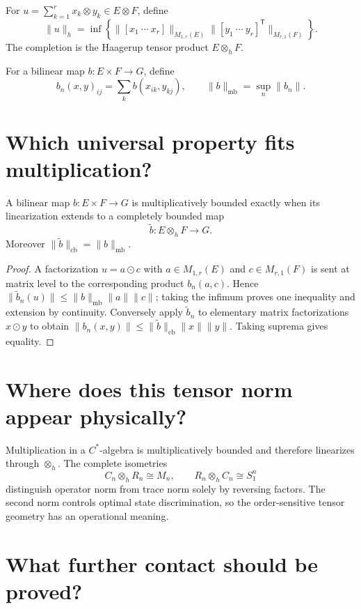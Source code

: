 For $u=\sum_{k=1}^r x_k\otimes y_k\in E\otimes F$, define
\[
\|u\|_h=\inf
\left\{
\|[x_1\ \cdots\ x_r]\|_{M_{1,r}(E)}
\|[y_1\ \cdots\ y_r]^{\mathsf T}\|_{M_{r,1}(F)}
\right\}.
\]
The completion is the Haagerup tensor product $E\otimes_hF$.

For a bilinear map $b:E\times F\to G$, define
\[
b_n(x,y)_{ij}=\sum_kb(x_{ik},y_{kj}),
\qquad \|b\|_{\mathrm{mb}}=\sup_n\|b_n\|.
\]

\section{Which universal property fits multiplication?}

\begin{theorem}
A bilinear map $b:E\times F\to G$ is multiplicatively bounded exactly when
its linearization extends to a completely bounded map
\[
\widetilde b:E\otimes_hF\to G.
\]
Moreover $\|\widetilde b\|_{\mathrm{cb}}=\|b\|_{\mathrm{mb}}$.
\end{theorem}

\begin{proof}
A factorization $u=a\odot c$ with
$a\in M_{1,r}(E)$ and $c\in M_{r,1}(F)$ is sent at matrix level to the
corresponding product $b_n(a,c)$.  Hence
$\|\widetilde b_n(u)\|\leq\|b\|_{\mathrm{mb}}\|a\|\|c\|$; taking the
infimum proves one inequality and extension by continuity.  Conversely apply
$\widetilde b_n$ to elementary matrix factorizations $x\odot y$ to obtain
$\|b_n(x,y)\|\leq\|\widetilde b\|_{\mathrm{cb}}\|x\|\|y\|$.  Taking
suprema gives equality.
\end{proof}

\section{Where does this tensor norm appear physically?}

Multiplication in a $C^*$-algebra is multiplicatively bounded and therefore
linearizes through $\otimes_h$.  The complete isometries
\[
C_n\otimes_hR_n\cong M_n,
\qquad
R_n\otimes_hC_n\cong S_1^n
\]
distinguish operator norm from trace norm solely by reversing factors.  The
second norm controls optimal state discrimination, so the order-sensitive
tensor geometry has an operational meaning.

\section{What further contact should be proved?}

